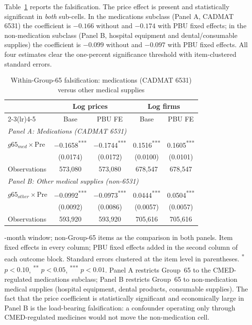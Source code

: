 \documentclass[12pt]{article}
\providecommand{\sym}[1]{\textsuperscript{#1}}
\begin{document}
Table~\ref{tab:app_within_g65} reports the falsification. The price effect
is present and statistically significant in \emph{both} sub-cells. In the
medications subclass (Panel A, CADMAT 6531) the coefficient is
\(-0.166\) without and \(-0.174\) with PBU fixed effects; in the non-medication
subclass (Panel B, hospital equipment and dental/consumable supplies) the
coefficient is \(-0.099\) without and \(-0.097\) with PBU fixed effects.
All four estimates clear the one-percent significance threshold with
item-clustered standard errors.

\begin{table}[!htbp]
\centering
\begin{threeparttable}
\caption{Within-Group-65 falsification: medications (CADMAT 6531) versus other medical supplies}
\label{tab:app_within_g65}
\footnotesize
\setlength{\tabcolsep}{6pt}
\begin{tabular}{lcccc}
\toprule
 & \multicolumn{2}{c}{Log prices} & \multicolumn{2}{c}{Log firms} \\
\cmidrule(lr){2-3}\cmidrule(lr){4-5}
 & Base & PBU FE & Base & PBU FE \\
\midrule
\multicolumn{5}{l}{\textit{Panel A: Medications (CADMAT 6531)}} \\
$g65_{med} \times \mathrm{Pre}$
 & $-$0.1658\sym{***} & $-$0.1744\sym{***} & 0.1516\sym{***} & 0.1605\sym{***} \\
 & (0.0174) & (0.0172) & (0.0100) & (0.0101) \\
Observations
 & 573,080 & 573,080 & 678,547 & 678,547 \\
\midrule
\multicolumn{5}{l}{\textit{Panel B: Other medical supplies (non-6531)}} \\
$g65_{other} \times \mathrm{Pre}$
 & $-$0.0992\sym{***} & $-$0.0973\sym{***} & 0.0444\sym{***} & 0.0504\sym{***} \\
 & (0.0092) & (0.0086) & (0.0057) & (0.0057) \\
Observations
 & 593,920 & 593,920 & 705,616 & 705,616 \\
\bottomrule
\end{tabular}
\begin{tablenotes}\footnotesize
\item \structuralWindowM-month window; non-Group-65 items as the comparison
in both panels. Item fixed effects in every column; PBU fixed effects added
in the second column of each outcome block. Standard errors clustered at the
item level in parentheses. \sym{*} $p<0.10$, \sym{**} $p<0.05$, \sym{***}
$p<0.01$. Panel A restricts Group~65 to the CMED-regulated medications
subclass; Panel B restricts Group~65 to non-medication medical supplies
(hospital equipment, dental products, consumable supplies). The fact that
the price coefficient is statistically significant and economically large
in Panel B is the load-bearing falsification: a confounder operating only
through CMED-regulated medicines would not move the non-medication cell.
\end{tablenotes}
\end{threeparttable}
\end{table}
\end{document}
